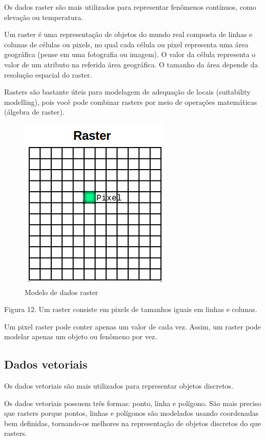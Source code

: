 \documentclass[
  portuguese,
]{krantz}
\begin{document}
Os dados raster são mais utilizados para representar fenômenos contínuos, como elevação ou temperatura.

Um raster é uma representação de objetos do mundo real composta de linhas e colunas de células ou pixels, no qual cada célula ou pixel representa uma área geográfica (pense em uma fotografia ou imagem). O valor da célula representa o valor de um atributo na referida área geográfica. O tamanho da área depende da resolução espacial do raster.

Rasters são bastante úteis para modelagem de adequação de locais (suitability modelling), pois você pode combinar rasters por meio de operações matemáticas (álgebra de raster).

\begin{figure}
\centering
\includegraphics{media/modulo0/raster.png}
\caption{Modelo de dados raster}
\end{figure}

Figura 12. Um raster consiste em pixels de tamanhos iguais em linhas e colunas.

Um pixel raster pode conter apenas um valor de cada vez. Assim, um raster pode modelar apenas um objeto ou fenômeno por vez.

\hypertarget{dados-vetoriais}{%
\subsection{Dados vetoriais}\label{dados-vetoriais}}

Os dados vetoriais são mais utilizados para representar objetos discretos.

Os dados vetoriais possuem três formas: ponto, linha e polígono. São mais preciso que rasters porque pontos, linhas e polígonos são modelados usando coordenadas bem definidas, tornando-os melhores na representação de objetos discretos do que rasters.
\end{document}

